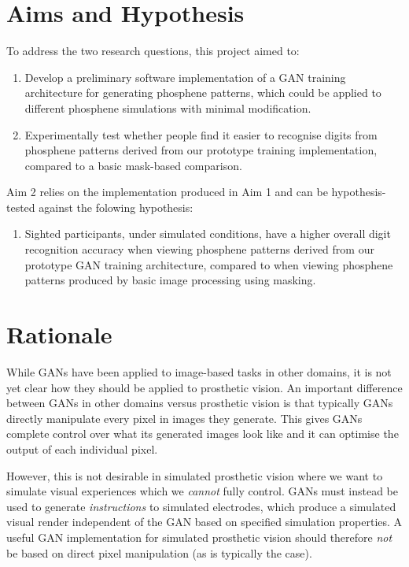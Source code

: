 \documentclass[a4paper,11pt,openany]{book}
\begin{document}
\section*{Aims and Hypothesis}
\label{sec:org8b5d0e1}

To address the two research questions, this project aimed to:

\begin{enumerate}
\item Develop a preliminary software implementation of a GAN training architecture for generating phosphene patterns, which could be applied to different phosphene simulations with minimal modification.
\item Experimentally test whether people find it easier to recognise digits from phosphene patterns derived from our prototype training implementation, compared to a basic mask-based comparison.
\end{enumerate}

Aim 2 relies on the implementation produced in Aim 1 and can be hypothesis-tested against the folowing hypothesis:

\begin{enumerate}
\item Sighted participants, under simulated conditions, have a higher overall digit recognition accuracy when viewing phosphene patterns derived from our prototype GAN training architecture, compared to when viewing phosphene patterns produced by basic image processing using masking.
\end{enumerate}

\section*{Rationale}
\label{sec:orgd9b2c59}

While GANs have been applied to image-based tasks in other domains, it is not yet clear how they should be applied to prosthetic vision.
An important difference between GANs in other domains versus prosthetic vision is that typically GANs directly manipulate every pixel in images they generate.
This gives GANs complete control over what its generated images look like and it can optimise the output of each individual pixel.

However, this is not desirable in simulated prosthetic vision where we want to simulate visual experiences which we \emph{cannot} fully control.
GANs must instead be used to generate \emph{instructions} to simulated electrodes, which produce a simulated visual render independent of the GAN based on specified simulation properties.
A useful GAN implementation for simulated prosthetic vision should therefore \emph{not} be based on direct pixel manipulation (as is typically the case).
\end{document}
